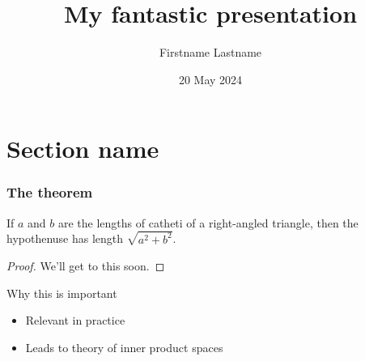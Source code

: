 \documentclass{beamer}
\title{My fantastic presentation}
\author[F.~Lastname]{Firstname Lastname}
\institute[U.~Puuhamaa]{University of Puuhamaa}
\date{20 May 2024}
\begin{document}
\maketitle

\section{Section name}

\begin{frame}
\frametitle{The theorem}

\begin{theorem}
If $a$ and $b$ are the lengths of catheti of a right-angled triangle,
then the hypothenuse has length $\sqrt{a^2 + b^2}$.
\end{theorem}
\begin{proof}
We'll get to this soon.
\end{proof}

\begin{block}{Why this is important}
\begin{itemize}
\item Relevant in practice
\item Leads to theory of inner product spaces
\end{itemize}
\end{block}

\end{frame}
\end{document}
